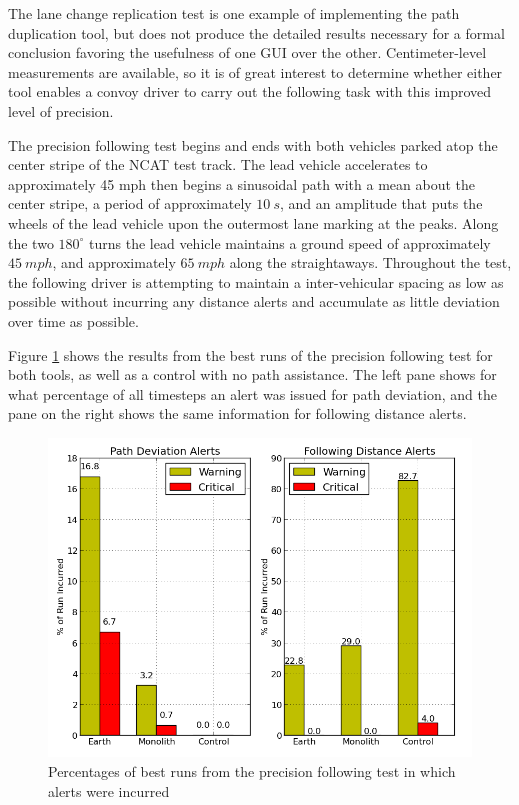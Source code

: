 \documentclass[twocolumn,10pt]{article}
\begin{document}
    The lane change replication test is one example of implementing the path duplication tool, but does not produce the detailed results necessary for a formal conclusion favoring the usefulness of one GUI over the other.  Centimeter-level measurements are available, so it is of great interest to determine whether either tool enables a convoy driver to carry out the following task with this improved level of precision.
    
    The precision following test begins and ends with both vehicles parked atop the center stripe of the NCAT test track.  The lead vehicle accelerates to approximately 45 mph then begins a sinusoidal path with a mean about the center stripe, a period of approximately $10~s$, and an amplitude that puts the wheels of the lead vehicle upon the outermost lane marking at the peaks.  Along the two $180^{\circ}$ turns the lead vehicle maintains a ground speed of approximately $45~mph$, and approximately $65~mph$ along the straightaways.  Throughout the test, the following driver is attempting to maintain a inter-vehicular spacing as low as possible without incurring any distance alerts and accumulate as little deviation over time as possible.

    Figure \ref{fig:precision_following_alert_percents} shows the results from the best runs of the precision following test for both tools, as well as a control with no path assistance. The left pane shows for what percentage of all timesteps an alert was issued for path deviation, and the pane on the right shows the same information for following distance alerts.

    \begin{figure}[ht] \centering
      \includegraphics[width=\columnwidth]{../graphics/precision_following_alert_percents.png}
      \caption{Percentages of best runs from the precision following test in which alerts were incurred}
      \label{fig:precision_following_alert_percents}
    \end{figure}
\end{document}
